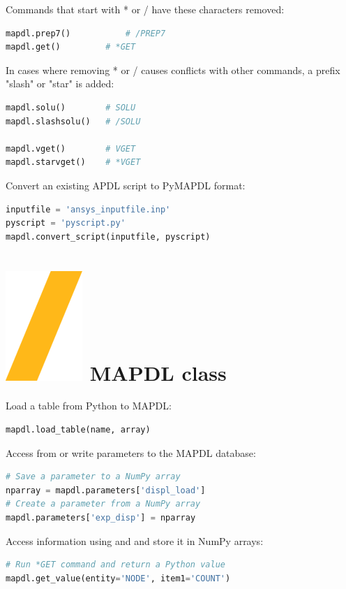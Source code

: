 \documentclass[9pt,landscape]{article}
\begin{document}
\begin{multicols}{3}
Commands that start with * or / have these characters removed:
\begin{lstlisting}[language=Python]
mapdl.prep7()	        # /PREP7
mapdl.get()	        # *GET
\end{lstlisting}

In cases where removing * or / causes conflicts with other commands, a prefix "slash" or "star" is added:
\begin{lstlisting}[language=Python]
mapdl.solu()		# SOLU
mapdl.slashsolu()	# /SOLU

mapdl.vget()		# VGET
mapdl.starvget()	# *VGET
\end{lstlisting} 

\columnbreak
Convert an existing APDL script to PyMAPDL format:
\begin{lstlisting}[language=Python]
inputfile = 'ansys_inputfile.inp'
pyscript = 'pyscript.py'
mapdl.convert_script(inputfile, pyscript)
\end{lstlisting} 

\section{\includegraphics[height=\fontcharht\font`\S]{slash.png} MAPDL class}
Load a table from Python to MAPDL:
\begin{lstlisting}[language=Python]
mapdl.load_table(name, array)
\end{lstlisting} 

Access from or write parameters to the MAPDL database:
\begin{lstlisting}[language=Python]
# Save a parameter to a NumPy array
nparray = mapdl.parameters['displ_load']
# Create a parameter from a NumPy array
mapdl.parameters['exp_disp'] = nparray
\end{lstlisting} 

Access information using  and  and store it in NumPy arrays:
\begin{lstlisting}[language=Python]
# Run *GET command and return a Python value
mapdl.get_value(entity='NODE', item1='COUNT')


\end{lstlisting}
\end{multicols}
\end{document}
